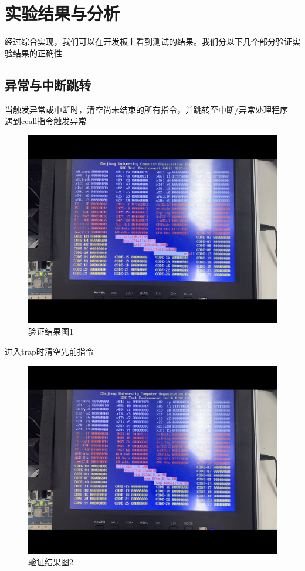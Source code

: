 \section{实验结果与分析}
经过综合实现，我们可以在开发板上看到测试的结果。我们分以下几个部分验证实验结果的正确性
\subsection{异常与中断跳转}
当触发异常或中断时，清空尚未结束的所有指令，并跳转至中断/异常处理程序\\
遇到ecall指令触发异常
\begin{figure}[H] %
	\centering %
	\includegraphics[width=1.0\textwidth]{figs/7.png} %
	\caption{验证结果图1} %
	\label{Fig.17} %
\end{figure}
进入trap时清空先前指令
\begin{figure}[H] %
	\centering %
	\includegraphics[width=1.0\textwidth]{figs/8.png} %
	\caption{验证结果图2} %
	\label{Fig.18} %
\end{figure}
